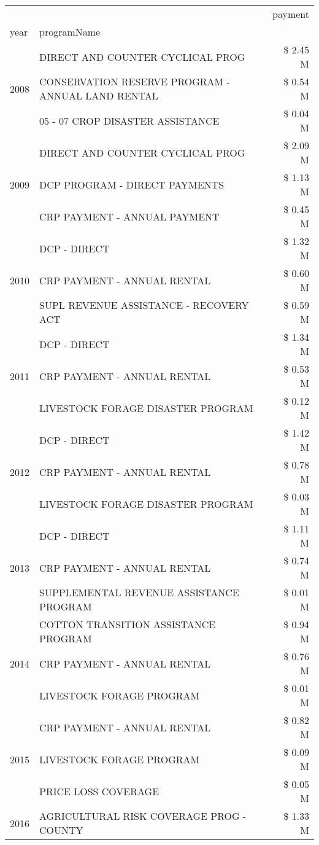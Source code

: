 \begin{tabular}{llr}
\toprule
 &  & payment \\
year & programName &  \\
\midrule
\multirow[t]{3}{*}{2008} & DIRECT AND COUNTER CYCLICAL PROG & \$ 2.45 M \\
 & CONSERVATION RESERVE PROGRAM - ANNUAL LAND RENTAL & \$ 0.54 M \\
 & 05 - 07 CROP DISASTER ASSISTANCE & \$ 0.04 M \\
\cline{1-3}
\multirow[t]{3}{*}{2009} & DIRECT AND COUNTER CYCLICAL PROG & \$ 2.09 M \\
 & DCP PROGRAM - DIRECT PAYMENTS & \$ 1.13 M \\
 & CRP PAYMENT - ANNUAL PAYMENT & \$ 0.45 M \\
\cline{1-3}
\multirow[t]{3}{*}{2010} & DCP - DIRECT & \$ 1.32 M \\
 & CRP PAYMENT - ANNUAL RENTAL & \$ 0.60 M \\
 & SUPL REVENUE ASSISTANCE - RECOVERY ACT & \$ 0.59 M \\
\cline{1-3}
\multirow[t]{3}{*}{2011} & DCP - DIRECT & \$ 1.34 M \\
 & CRP PAYMENT - ANNUAL RENTAL & \$ 0.53 M \\
 & LIVESTOCK FORAGE DISASTER PROGRAM & \$ 0.12 M \\
\cline{1-3}
\multirow[t]{3}{*}{2012} & DCP - DIRECT & \$ 1.42 M \\
 & CRP PAYMENT - ANNUAL RENTAL & \$ 0.78 M \\
 & LIVESTOCK FORAGE DISASTER PROGRAM & \$ 0.03 M \\
\cline{1-3}
\multirow[t]{3}{*}{2013} & DCP - DIRECT & \$ 1.11 M \\
 & CRP PAYMENT - ANNUAL RENTAL & \$ 0.74 M \\
 & SUPPLEMENTAL REVENUE ASSISTANCE PROGRAM & \$ 0.01 M \\
\cline{1-3}
\multirow[t]{3}{*}{2014} & COTTON TRANSITION ASSISTANCE PROGRAM & \$ 0.94 M \\
 & CRP PAYMENT - ANNUAL RENTAL & \$ 0.76 M \\
 & LIVESTOCK FORAGE PROGRAM & \$ 0.01 M \\
\cline{1-3}
\multirow[t]{3}{*}{2015} & CRP PAYMENT - ANNUAL RENTAL & \$ 0.82 M \\
 & LIVESTOCK FORAGE PROGRAM & \$ 0.09 M \\
 & PRICE LOSS COVERAGE & \$ 0.05 M \\
\cline{1-3}
\multirow[t]{3}{*}{2016} & AGRICULTURAL RISK COVERAGE PROG - COUNTY & \$ 1.33 M \\

\end{tabular}
